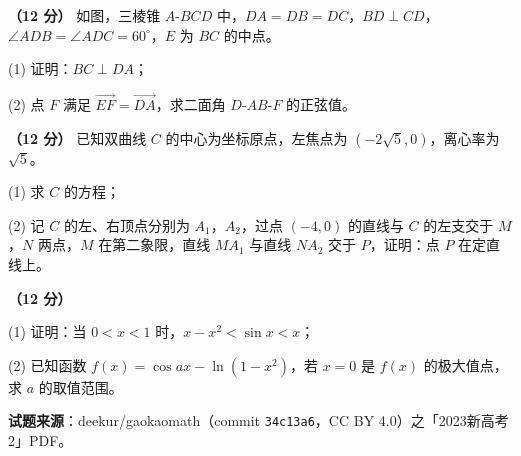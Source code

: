 \textbf{（12 分）} 如图，三棱锥 $A\text{-}BCD$ 中，$DA=DB=DC$，$BD\perp CD$，$\angle ADB=\angle ADC=60^\circ$，$E$ 为 $BC$ 的中点。

\begin{center}\end{center}

  (1) 证明：$BC\perp DA$；

  (2) 点 $F$ 满足 $\overrightarrow{EF}=\overrightarrow{DA}$，求二面角 $D\text{-}AB\text{-}F$ 的正弦值。

\textbf{（12 分）} 已知双曲线 $C$ 的中心为坐标原点，左焦点为 $\left(-2\sqrt5,0\right)$，离心率为 $\sqrt5$。

  (1) 求 $C$ 的方程；

  (2) 记 $C$ 的左、右顶点分别为 $A_1$，$A_2$，过点 $(-4,0)$ 的直线与 $C$ 的左支交于 $M$，$N$ 两点，$M$ 在第二象限，直线 $MA_1$ 与直线 $NA_2$ 交于 $P$，证明：点 $P$ 在定直线上。

\textbf{（12 分）} 

  (1) 证明：当 $0<x<1$ 时，$x-x^{2}<\sin x<x$；

  (2) 已知函数 $f(x)=\cos ax-\ln\left(1-x^{2}\right)$，若 $x=0$ 是 $f(x)$ 的极大值点，求 $a$ 的取值范围。

\par\medskip

\begin{gktip}
\textbf{试题来源}：deekur/gaokaomath（commit \texttt{34c13a6}，CC BY 4.0）之「2023新高考2」PDF。
\end{gktip}
